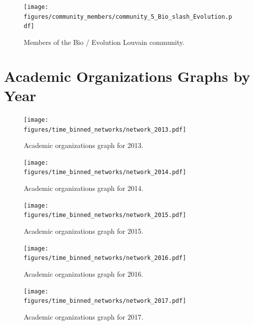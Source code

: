 \documentclass[notitlepage,aps,prd,nofootinbib]{revtex4-1}
\newcommand{\figures}{../outputs/plots}
\begin{document}
\begin{figure}[!htb]\centering
  \texttt{[image: \\figures/community\_members/community\_5\_Bio\_slash\_Evolution.pdf]}
  \caption{Members of the Bio / Evolution Louvain community.}
\end{figure}


\appendix*
\section{Academic Organizations Graphs by Year}

\begin{figure}[!htb]\centering
  \texttt{[image: \\figures/time\_binned\_networks/network\_2013.pdf]}
  \caption{Academic organizations graph for 2013.}
\end{figure}

\begin{figure}[!htb]\centering
  \texttt{[image: \\figures/time\_binned\_networks/network\_2014.pdf]}
  \caption{Academic organizations graph for 2014.}
\end{figure}

\begin{figure}[!htb]\centering
  \texttt{[image: \\figures/time\_binned\_networks/network\_2015.pdf]}
  \caption{Academic organizations graph for 2015.}
\end{figure}

\begin{figure}[!htb]\centering
  \texttt{[image: \\figures/time\_binned\_networks/network\_2016.pdf]}
  \caption{Academic organizations graph for 2016.}
\end{figure}

\begin{figure}[!htb]\centering
  \texttt{[image: \\figures/time\_binned\_networks/network\_2017.pdf]}
  \caption{Academic organizations graph for 2017.}
\end{figure}
\end{document}
